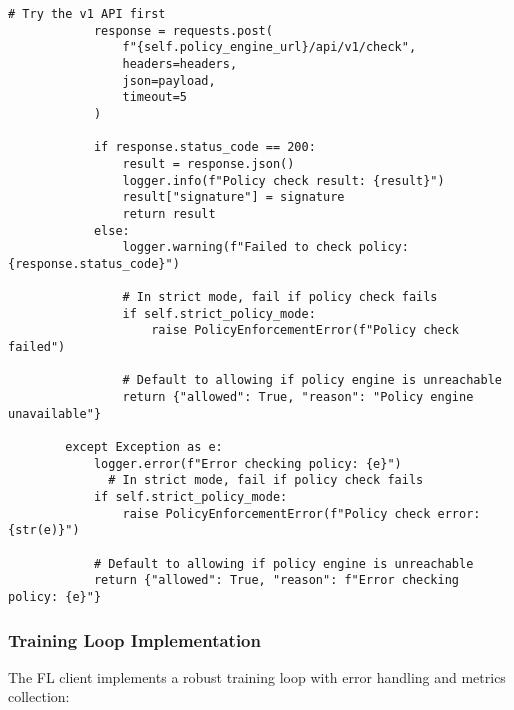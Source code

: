 \begin{lstlisting}[style=pythoncode, caption=FL Client Implementation]
            # Try the v1 API first
            response = requests.post(
                f"{self.policy_engine_url}/api/v1/check",
                headers=headers,
                json=payload,
                timeout=5
            )
            
            if response.status_code == 200:
                result = response.json()
                logger.info(f"Policy check result: {result}")
                result["signature"] = signature
                return result
            else:
                logger.warning(f"Failed to check policy: {response.status_code}")
                
                # In strict mode, fail if policy check fails
                if self.strict_policy_mode:
                    raise PolicyEnforcementError(f"Policy check failed")
                
                # Default to allowing if policy engine is unreachable
                return {"allowed": True, "reason": "Policy engine unavailable"}
                
        except Exception as e:
            logger.error(f"Error checking policy: {e}")
              # In strict mode, fail if policy check fails
            if self.strict_policy_mode:
                raise PolicyEnforcementError(f"Policy check error: {str(e)}")
            
            # Default to allowing if policy engine is unreachable
            return {"allowed": True, "reason": f"Error checking policy: {e}"}
\end{lstlisting}

\subsubsection{Training Loop Implementation}

The FL client implements a robust training loop with error handling and metrics collection:

